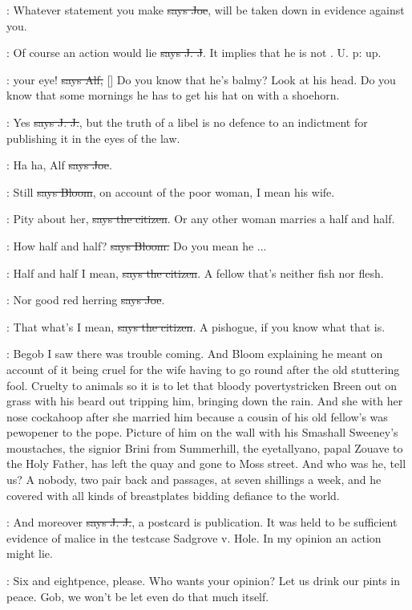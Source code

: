 \joe:
Whatever statement you make \sout{says Joe},
will be taken down in evidence
against you.

\jjom:
Of course an action would lie \sout{says J. J}.
It implies that he is not
. U. p: up.

\bergan:
 your eye!
\sout{says Alf,} []
Do you know that he's balmy?
Look at his head. Do you know that some mornings he has to get his hat on
with a shoehorn.

\jjom:
Yes \sout{says J. J.},
but the truth of a libel is no defence to an indictment
for publishing it in the eyes of the law.

\joe:
Ha ha, Alf \sout{says Joe}.

\Bloom:
Still \sout{says Bloom}, on account of the poor woman,
I mean his wife.

\citizen:
Pity about her, \sout{says the citizen}.
Or any other woman marries a half and half.

\Bloom:
How half and half? \sout{says Bloom.}
Do you mean he ...

\citizen:
Half and half I mean, \sout{says the citizen}.
A fellow that's neither fish nor flesh.

\joe:
Nor good red herring \sout{says Joe}.

\citizen:
That what's I mean, \sout{says the citizen}.
A pishogue, if you know what that is.

\Nq:
Begob I saw there was trouble coming.
And Bloom explaining he meant on
account of it being cruel for the wife having to go round after the
old stuttering fool. Cruelty to animals so it is to let that bloody
povertystricken Breen out on grass with his beard out tripping him,
bringing down the rain. And she with her nose cockahoop after she married
him because a cousin of his old fellow's was pewopener to the pope.
Picture of him on the wall with his Smashall Sweeney's moustaches, the
signior Brini from Summerhill, the eyetallyano, papal Zouave to the Holy
Father, has left the quay and gone to Moss street. And who was he, tell
us? A nobody, two pair back and passages, at seven shillings a week, and
he covered with all kinds of breastplates
bidding defiance to the world.

\jjom:
And moreover \sout{says J. J.},
a postcard is publication. It was held to be
sufficient evidence of malice in the testcase Sadgrove v. Hole. In my
opinion an action might lie.

\Nq:
Six and eightpence, please. Who wants your opinion? Let us drink
our pints in peace. Gob, we won't be let even do that much itself.

